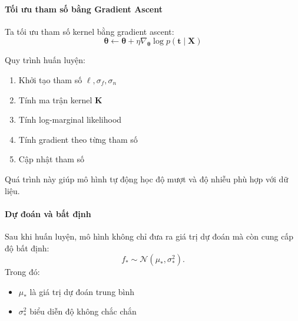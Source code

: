 \paragraph{Tối ưu tham số bằng Gradient Ascent}

Ta tối ưu tham số kernel bằng gradient ascent: \begin{equation}
  \boldsymbol{\theta} \leftarrow \boldsymbol{\theta} + \eta
  \nabla_{\boldsymbol{\theta}} \log p(\boldsymbol{t} \mid \boldsymbol{X})
\end{equation}

Quy trình huấn luyện: \begin{enumerate}
    \item Khởi tạo tham số $\ell, \sigma_f, \sigma_n$
    \item Tính ma trận kernel $\boldsymbol{K}$
    \item Tính log-marginal likelihood
    \item Tính gradient theo từng tham số
    \item Cập nhật tham số
\end{enumerate}

Quá trình này giúp mô hình tự động học độ mượt và độ nhiễu phù hợp với dữ liệu.

\paragraph{Dự đoán và bất định}

Sau khi huấn luyện, mô hình không chỉ đưa ra giá trị dự đoán mà còn cung cấp độ
bất định: \begin{equation}
  f_* \sim \mathcal{N}(\mu_*, \sigma_*^2).
\end{equation} Trong đó:
\begin{itemize}
    \item $\mu_*$ là giá trị dự đoán trung bình
    \item $\sigma_*^2$ biểu diễn độ không chắc chắn
\end{itemize}
